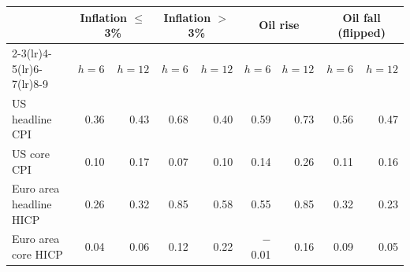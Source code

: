 \begin{tabular}{lrrrrrrrr}
\toprule
 & \multicolumn{2}{c}{Inflation $\leq$ 3\%} & \multicolumn{2}{c}{Inflation $>$ 3\%} & \multicolumn{2}{c}{Oil rise} & \multicolumn{2}{c}{Oil fall (flipped)}\\
\cmidrule(lr){2-3}\cmidrule(lr){4-5}\cmidrule(lr){6-7}\cmidrule(lr){8-9}
 & $h=6$ & $h=12$ & $h=6$ & $h=12$ & $h=6$ & $h=12$ & $h=6$ & $h=12$\\
\midrule
US headline CPI & 0.36 & 0.43 & 0.68 & 0.40 & 0.59 & 0.73 & 0.56 & 0.47\\
US core CPI & 0.10 & 0.17 & 0.07 & 0.10 & 0.14 & 0.26 & 0.11 & 0.16\\
Euro area headline HICP & 0.26 & 0.32 & 0.85 & 0.58 & 0.55 & 0.85 & 0.32 & 0.23\\
Euro area core HICP & 0.04 & 0.06 & 0.12 & 0.22 & $-$0.01 & 0.16 & 0.09 & 0.05\\
\bottomrule
\end{tabular}